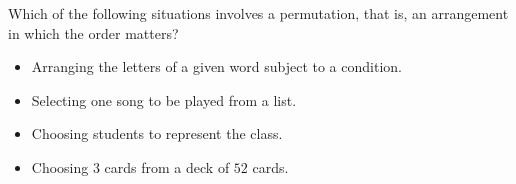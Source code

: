 Which of the following situations involves a permutation, that is, an arrangement in which the order matters?
\begin{itemize}
\item[\textbf{(A)}] Arranging the letters of a given word subject to a condition.
\item[\textbf{(B)}] Selecting one song to be played from a list.
\item[\textbf{(C)}] Choosing students to represent the class.
\item[\textbf{(D)}] Choosing $3$ cards from a deck of $52$ cards.
\end{itemize}
